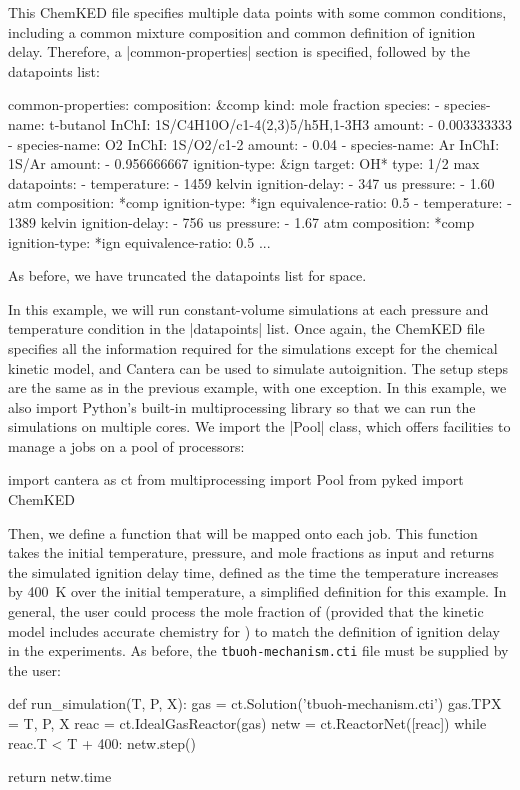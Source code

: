 \documentclass[12pt]{ijck}
\newcommand\ck{ChemKED}
\begin{document}
This \ck{} file specifies multiple data points with some common
conditions, including a common mixture composition and common definition of
ignition delay. Therefore, a \yabox|common-properties| section is specified, followed by the
datapoints list:
%
\begin{yamlbox}
common-properties:
  composition: &comp
    kind: mole fraction
    species:
      - species-name: t-butanol
        InChI: 1S/C4H10O/c1-4(2,3)5/h5H,1-3H3
        amount:
          - 0.003333333
      - species-name: O2
        InChI:  1S/O2/c1-2
        amount:
          - 0.04
      - species-name: Ar
        InChI:  1S/Ar
        amount:
          - 0.956666667
  ignition-type: &ign
    target: OH*
    type: 1/2 max
datapoints:
  - temperature:
      - 1459 kelvin
    ignition-delay:
      - 347 us
    pressure:
      - 1.60 atm
    composition: *comp
    ignition-type: *ign
    equivalence-ratio: 0.5
  - temperature:
      - 1389 kelvin
    ignition-delay:
      - 756 us
    pressure:
      - 1.67 atm
    composition: *comp
    ignition-type: *ign
    equivalence-ratio: 0.5
    ...
\end{yamlbox}
%
As before, we have truncated the datapoints list for space.

In this example, we will run constant-volume simulations at each
pressure and temperature condition in the \yabox|datapoints| list. Once again,
the \ck{} file specifies all the information required for the simulations except
for the chemical kinetic model, and Cantera can be used to simulate autoignition. The setup steps
are the same as in the previous example, with one exception. In this example, we also import
Python's built-in multiprocessing library so that we can run the simulations on multiple cores. We
import the \pybox|Pool| class, which offers facilities to manage a jobs on a pool of processors:
%
\begin{pythonbox}
import cantera as ct
from multiprocessing import Pool
from pyked import ChemKED
\end{pythonbox}

Then, we define a function that will be mapped onto each job. This function takes the initial
temperature, pressure, and mole fractions as input and returns the simulated ignition delay time,
defined as the time the temperature increases by \SI{400}{\K} over the initial temperature, a
simplified definition for this example. In general, the user could process the mole fraction of
 (provided that the kinetic model includes accurate chemistry for ) to match the
definition of ignition delay in the experiments. As before, the \verb|tbuoh-mechanism.cti| file must
be supplied by the user:
%
\begin{pythonbox}
def run_simulation(T, P, X):
    gas = ct.Solution('tbuoh-mechanism.cti')
    gas.TPX = T, P, X
    reac = ct.IdealGasReactor(gas)
    netw = ct.ReactorNet([reac])
    while reac.T < T + 400:
        netw.step()

    return netw.time
\end{pythonbox}
\end{document}
